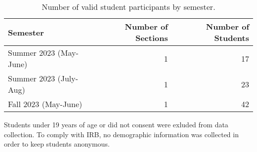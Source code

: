 \documentclass[
]{article}
\begin{document}
\begin{table}[H]

\begin{threeparttable}
\caption{\label{tab:unnamed-chunk-5}Number of valid student participants by semester.}
\centering
\begin{tabular}[t]{lrr}
\toprule
Semester & Number of Sections & Number of Students\\
\midrule
Summer 2023 (May-June) & 1 & 17\\
Summer 2023 (July-Aug) & 1 & 23\\
Fall 2023 (May-June) & 1 & 42\\
\bottomrule
\end{tabular}
\begin{tablenotes}
\small
\item [] Students under 19 years of age or did not consent were exluded from data collection. To comply with IRB, no demographic information was collected in order to keep students anonymous.
\end{tablenotes}
\end{threeparttable}
\end{table}
\end{document}
